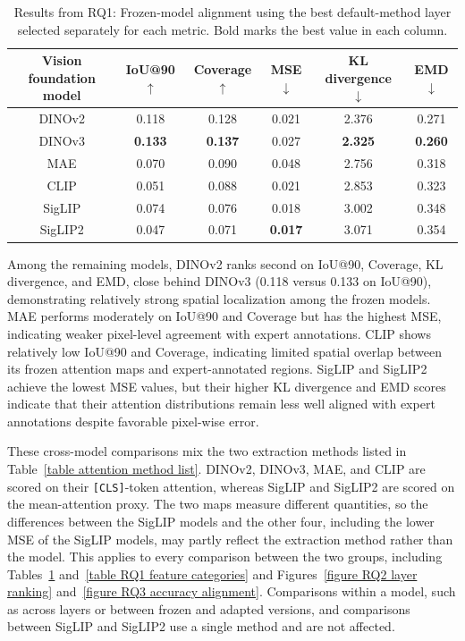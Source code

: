 \documentclass[lineno,pdflatex,sn-mathphys-num]{sn-jnl}%
\theoremstyle{thmstyleone}%
\theoremstyle{thmstyletwo}%
\theoremstyle{thmstylethree}%
\begin{document}
\begin{table}[!h]
\centering
\caption{Results from RQ1: Frozen-model alignment using the best default-method layer selected separately for each metric. Bold marks the best value in each column.\label{table RQ1 result}}
\begin{tabular}{cccccc}
\toprule
Vision foundation model & IoU@90 $\uparrow$ & Coverage $\uparrow$ & MSE $\downarrow$ & KL divergence $\downarrow$ & EMD $\downarrow$ \\ \midrule
DINOv2    & 0.118 & 0.128 & 0.021 & 2.376 & 0.271 \\
DINOv3     & \textbf{0.133} & \textbf{0.137} & 0.027 & \textbf{2.325} & \textbf{0.260} \\
MAE        & 0.070 & 0.090 & 0.048 & 2.756 & 0.318 \\
CLIP      & 0.051 & 0.088 & 0.021 & 2.853 & 0.323 \\
SigLIP    & 0.074 & 0.076 & 0.018 & 3.002 & 0.348 \\
SigLIP2   & 0.047 & 0.071 & \textbf{0.017} & 3.071 & 0.354 \\ \bottomrule
\end{tabular}
\end{table}

Among the remaining models, DINOv2 ranks second on IoU@90, Coverage, KL divergence, and EMD, close behind DINOv3 (0.118 versus 0.133 on IoU@90), demonstrating relatively strong spatial localization among the frozen models. MAE performs moderately on IoU@90 and Coverage but has the highest MSE, indicating weaker pixel-level agreement with expert annotations. CLIP shows relatively low IoU@90 and Coverage, indicating limited spatial overlap between its frozen attention maps and expert-annotated regions. SigLIP and SigLIP2 achieve the lowest MSE values, but their higher KL divergence and EMD scores indicate that their attention distributions remain less well aligned with expert annotations despite favorable pixel-wise error.

These cross-model comparisons mix the two extraction methods listed in Table~\ref{table attention method list}. DINOv2, DINOv3, MAE, and CLIP are scored on their \texttt{[CLS]}-token attention, whereas SigLIP and SigLIP2 are scored on the mean-attention proxy. The two maps measure different quantities, so the differences between the SigLIP models and the other four, including the lower MSE of the SigLIP models, may partly reflect the extraction method rather than the model. This applies to every comparison between the two groups, including Tables~\ref{table RQ1 result} and~\ref{table RQ1 feature categories} and Figures~\ref{figure RQ2 layer ranking} and~\ref{figure RQ3 accuracy alignment}. Comparisons within a model, such as across layers or between frozen and adapted versions, and comparisons between SigLIP and SigLIP2 use a single method and are not affected.
\end{document}
